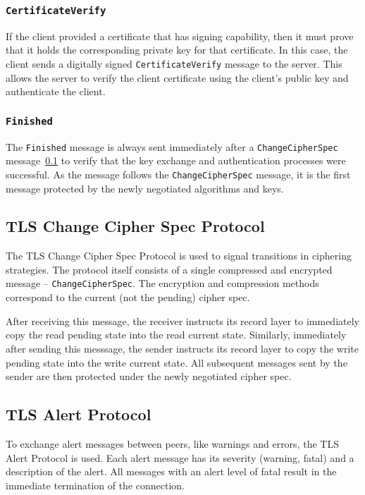 \subsubsection{\texttt{CertificateVerify}}
    If the client provided a certificate that has signing capability, then it
    must prove that it holds the corresponding private key for that certificate.
    In this case, the client sends a digitally signed \texttt{CertificateVerify}
    message to the server. This allows the server to verify the client certificate
    using the client's public key and authenticate the client.

\subsubsection{\texttt{Finished}}
    The \texttt{Finished} message is always sent immediately after a
    \texttt{ChangeCipherSpec} message~\ref{ref:change_cipher_spec} to verify
    that the key exchange and authentication processes were successful.
    As the message follows the \texttt{ChangeCipherSpec} message, it is the
    first message protected by the newly negotiated algorithms and keys.

\subsection{TLS Change Cipher Spec Protocol} \label{ref:change_cipher_spec}
    The TLS Change Cipher Spec Protocol is used to signal transitions in
    ciphering strategies. The protocol itself consists of a single compressed
    and encrypted message -- \texttt{ChangeCipherSpec}. The encryption and
    compression methods correspond to the current (not the pending) cipher
    spec.

    After receiving this message, the receiver instructs its record layer
    to immediately copy the read pending state into the read current state.
    Similarly, immediately after sending this messsage, the sender instructs
    its record layer to copy the write pending state into the write current
    state. All subsequent messages sent by the sender are then protected under
    the newly negotiated cipher spec.

\subsection{TLS Alert Protocol}
    To exchange alert messages between peers, like warnings and errors, the
    TLS Alert Protocol is used. Each alert message has its severity (warning,
    fatal) and a description of the alert. All messages with an alert level
    of fatal result in the immediate termination of the connection.


